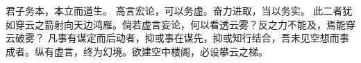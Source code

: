 \documentclass{article}
\begin{document}
君子务本，本立而道生。
高言宏论，可以务虚。奋力进取，当以务实。
此二者犹如穿云之箭射向天边鸿雁。倘若虚言妄论，何以看透云雾？反之力不能及，焉能穿云破雾？
凡事有谋定而后动者，抑或事在谋先，抑或知行结合，吾未见空想而事成者。纵有虚言，终为幻境。欲建空中楼阁，必设攀云之梯。
\end{document}
